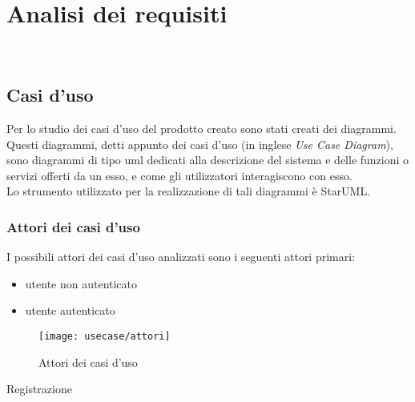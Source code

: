 
\chapter{Analisi dei requisiti}
\label{cap:analisi-requisiti}

\\

\section{Casi d'uso}

Per lo studio dei casi d'uso del prodotto creato sono stati creati dei diagrammi.
Questi diagrammi, detti appunto dei casi d'uso (in inglese \emph{Use Case Diagram}), sono diagrammi di tipo \gls{uml} dedicati alla descrizione del sistema e delle funzioni o servizi offerti da un esso, e come gli utilizzatori interagiscono con esso.\\
Lo strumento utilizzato per la realizzazione di tali diagrammi è StarUML.

\subsection{Attori dei casi d'uso}
I possibili attori dei casi d'uso analizzati sono i seguenti attori primari:
\begin{itemize}
	\item utente non autenticato
	\item utente autenticato
\end{itemize}
\begin{figure}[H] 
	\centering 
	\texttt{[image: usecase/attori]} 
	\caption{Attori dei casi d'uso}
\end{figure}

\begin{usecase}{1}{Registrazione}
\end{usecase}


